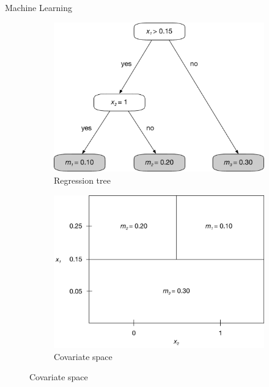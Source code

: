 \documentclass[aspectratio=169, xcolor=dvipsnames]{beamer}
\begin{document}
\begin{frame}{Machine Learning}
\begin{figure}
\begin{subfigure}[h]{0.4\linewidth}
\includegraphics[width=\linewidth]{tree}
\caption{Regression tree}
\end{subfigure}
\hspace{10pt}
\begin{subfigure}[h]{0.4\linewidth}
\includegraphics[width=\linewidth]{partition}
\caption{Covariate space}
\end{subfigure}
\end{figure}
\end{frame}
\end{document}
